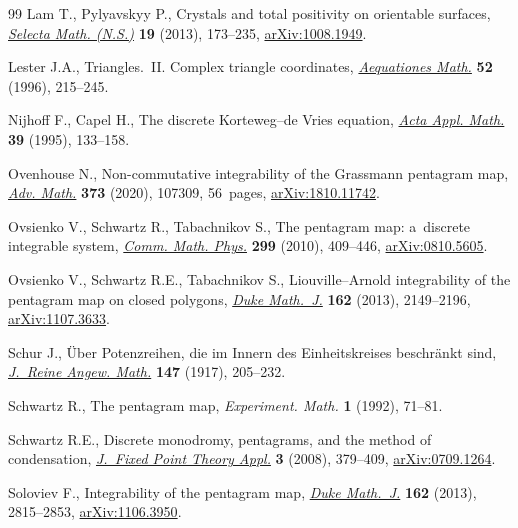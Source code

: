 \documentclass[10pt,a4paper]{amsart}
\numberwithin{equation}{section}
\begin{document}
\begin{thebibliography}{99}
Lam T., Pylyavskyy P., Crystals and total positivity on orientable surfaces,
 \href{https://doi.org/10.1007/s00029-012-0094-2}{\textit{Selecta Math.
 (N.S.)}} \textbf{19} (2013), 173--235,
 \href{http://arxiv.org/abs/1008.1949}{arXiv:1008.1949}.

Lester J.A., Triangles.~{II}. {C}omplex triangle coordinates,
 \href{https://doi.org/10.1007/BF01818341}{\textit{Aequationes Math.}}
 \textbf{52} (1996), 215--245.

Nijhoff F., Capel H., The discrete {K}orteweg--de {V}ries equation,
 \href{https://doi.org/10.1007/BF00994631}{\textit{Acta Appl. Math.}}
 \textbf{39} (1995), 133--158.

Ovenhouse N., Non-commutative integrability of the {G}rassmann pentagram map,
 \href{https://doi.org/10.1016/j.aim.2020.107309}{\textit{Adv. Math.}}
 \textbf{373} (2020), 107309, 56~pages,
 \href{http://arxiv.org/abs/1810.11742}{arXiv:1810.11742}.

Ovsienko V., Schwartz R., Tabachnikov S., The pentagram map: a~discrete
 integrable system,
 \href{https://doi.org/10.1007/s00220-010-1075-y}{\textit{Comm. Math. Phys.}}
 \textbf{299} (2010), 409--446,
 \href{http://arxiv.org/abs/0810.5605}{arXiv:0810.5605}.

Ovsienko V., Schwartz R.E., Tabachnikov S., Liouville--{A}rnold integrability
 of the pentagram map on closed polygons,
 \href{https://doi.org/10.1215/00127094-2348219}{\textit{Duke Math.~J.}}
 \textbf{162} (2013), 2149--2196,
 \href{http://arxiv.org/abs/1107.3633}{arXiv:1107.3633}.

Schur J., \"Uber {P}otenzreihen, die im {I}nnern des {E}inheitskreises
 beschr\"ankt sind,
 \href{https://doi.org/10.1515/crll.1917.147.205}{\textit{J.~Reine Angew.
 Math.}} \textbf{147} (1917), 205--232.

Schwartz R., The pentagram map, \textit{Experiment. Math.} \textbf{1} (1992),
 71--81.

Schwartz R.E., Discrete monodromy, pentagrams, and the method of condensation,
 \href{https://doi.org/10.1007/s11784-008-0079-0}{\textit{J.~Fixed Point
 Theory Appl.}} \textbf{3} (2008), 379--409,
 \href{http://arxiv.org/abs/0709.1264}{arXiv:0709.1264}.

Soloviev F., Integrability of the pentagram map,
 \href{https://doi.org/10.1215/00127094-2382228}{\textit{Duke Math.~J.}}
 \textbf{162} (2013), 2815--2853,
 \href{http://arxiv.org/abs/1106.3950}{arXiv:1106.3950}.


\end{thebibliography}
\end{document}
